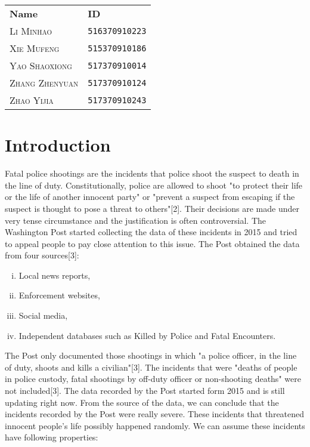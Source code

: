 \documentclass[11pt,a4paper,english]{article}
\begin{document}
\begin{table}[h!]
\centering
\begin{tabular}{ll}
\textbf{Name} & \textbf{ID} \\
\textsc{Li Minhao} & \texttt{516370910223} \\
\textsc{Xie Mufeng} &  \texttt{515370910186} \\
\textsc{Yao Shaoxiong} & \texttt{517370910014} \\
\textsc{Zhang Zhenyuan} & \texttt{517370910124} \\
\textsc{Zhao Yijia} &  \texttt{517370910243} \\
\end{tabular}
\end{table}
\newpage
\begin{abstract}
\end{abstract}
\newpage
\tableofcontents
\newpage\section{Introduction}
Fatal police shootings are the incidents that police shoot the suspect to death in the line of duty. Constitutionally, police are allowed to shoot "to protect their life or the life of another innocent party" or "prevent a suspect from escaping if the suspect is thought to pose a threat to others"[2]. Their decisions are made under very tense circumstance and the justification is often controversial. The Washington Post started collecting the data of these incidents in 2015 and tried to appeal people to pay close attention to this issue. The Post obtained the data from four sources[3]: 
\begin{enumerate}[(i)]
    \item Local news reports, 
    \item Enforcement websites, 
    \item Social media,
    \item Independent databases such as Killed by Police and Fatal Encounters. 
\end{enumerate}
The Post only documented those shootings in which "a police officer, in the line of duty, shoots and kills a civilian"[3]. The incidents that were "deaths of people in police custody, fatal shootings by off-duty officer or non-shooting deaths" were not included[3]. The data recorded by the Post started form 2015 and is still updating right now. From the source of the data, we can conclude that the incidents recorded by the Post were really severe. These incidents that threatened innocent people's life possibly happened randomly. We can assume these incidents have following properties:
\end{document}
